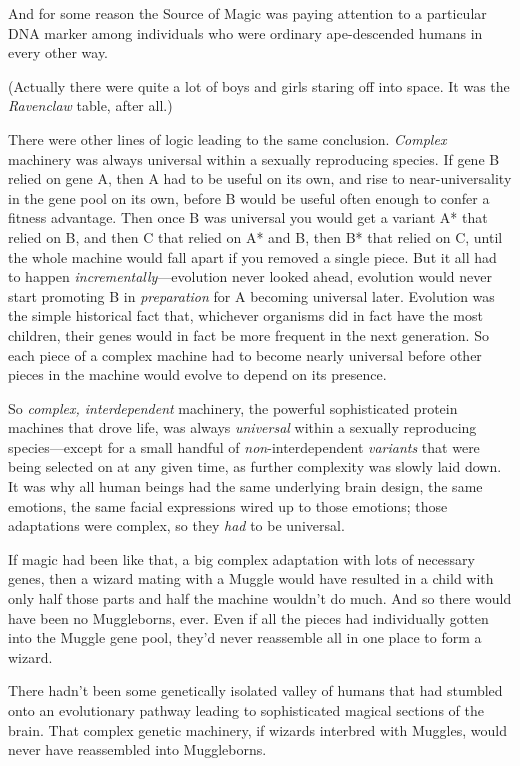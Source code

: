 And for some reason the Source of Magic was paying attention to a particular 
DNA marker among individuals who were ordinary ape-descended humans in every 
other way.

(Actually there were quite a lot of boys and girls staring off into space. It 
was the \emph{Ravenclaw} table, after all.)

There were other lines of logic leading to the same conclusion. \emph{Complex} 
machinery was always universal within a sexually reproducing species. If gene B 
relied on gene A, then A had to be useful on its own, and rise to 
near-universality in the gene pool on its own, before B would be useful often 
enough to confer a fitness advantage. Then once B was universal you would get a 
variant A* that relied on B, and then C that relied on A* and B, then B* that 
relied on C, until the whole machine would fall apart if you removed a single 
piece. But it all had to happen \emph{incrementally}---evolution never looked 
ahead, evolution would never start promoting B in \emph{preparation} for A 
becoming universal later. Evolution was the simple historical fact that, 
whichever organisms did in fact have the most children, their genes would in 
fact be more frequent in the next generation. So each piece of a complex 
machine had to become nearly universal before other pieces in the machine would 
evolve to depend on its presence.

So \emph{complex, interdependent} machinery, the powerful sophisticated protein 
machines that drove life, was always \emph{universal} within a sexually 
reproducing species---except for a small handful of \emph{non}-interdependent 
\emph{variants} that were being selected on at any given time, as further 
complexity was slowly laid down. It was why all human beings had the same 
underlying brain design, the same emotions, the same facial expressions wired 
up to those emotions; those adaptations were complex, so they \emph{had} to be 
universal.

If magic had been like that, a big complex adaptation with lots of necessary 
genes, then a wizard mating with a Muggle would have resulted in a child with 
only half those parts and half the machine wouldn't do much. And so there would 
have been no Muggleborns, ever. Even if all the pieces had individually gotten 
into the Muggle gene pool, they'd never reassemble all in one place to form a 
wizard.

There hadn't been some genetically isolated valley of humans that had stumbled 
onto an evolutionary pathway leading to sophisticated magical sections of the 
brain. That complex genetic machinery, if wizards interbred with Muggles, would 
never have reassembled into Muggleborns.

